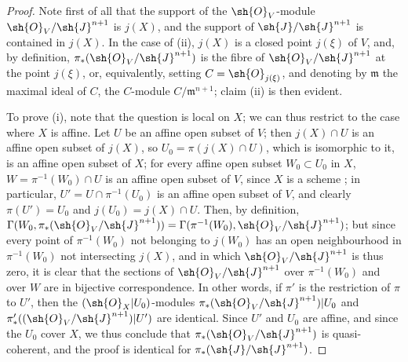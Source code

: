 \begin{proof}
Note first of all that the support of the $\sh{O}_V$-module $\sh{O}_V/\sh{J}^{n+1}$ is $j(X)$, and the support of $\sh{J}/\sh{J}^{n+1}$ is contained in $j(X)$.
In the case of (ii), $j(X)$ is a closed point $j(\xi)$ of $V$,
and, by definition, $\pi_*(\sh{O}_V/\sh{J}^{n+1})$ is the fibre of $\sh{O}_V/\sh{J}^{n+1}$ at the point $j(\xi)$, or, equivalently, setting $C=\sh{O}_{j(\xi)}$, and denoting by $\mathfrak{m}$ the maximal ideal of $C$, the $C$-module $C/\mathfrak{m}^{n+1}$;
claim (ii) is then evident.

To prove (i), note that the question is local on $X$;
we can thus restrict to the case where $X$ is affine.
Let $U$ be an affine open subset of $V$;
then $j(X)\cap U$ is an affine open subset of $j(X)$, so $U_0=\pi(j(X)\cap U)$, which is isomorphic to it, is an affine open subset of $X$;
for every affine open subset $W_0\subset U_0$ in $X$, $W=\pi^{-1}(W_0)\cap U$ is an affine open subset of $V$, since $X$ is a scheme ;
in particular, $U'=U\cap\pi^{-1}(U_0)$ is an affine open subset of $V$, and clearly $\pi(U')=U_0$ and $j(U_0)=j(X)\cap U$.
Then, by definition, $\Gamma(W_0,\pi_*(\sh{O}_V/\sh{J}^{n+1})) = \Gamma(\pi^{-1}(W_0),\sh{O}_V/\sh{J}^{n+1})$;
but since every point of $\pi^{-1}(W_0)$ not belonging to $j(W_0)$ has an open neighbourhood in $\pi^{-1}(W_0)$ not intersecting $j(X)$, and in which $\sh{O}_V/\sh{J}^{n+1}$ is thus zero, it is clear that the sections of $\sh{O}_V/\sh{J}^{n+1}$ over $\pi^{-1}(W_0)$ and over $W$ are in bijective correspondence.
In other words, if $\pi'$ is the restriction of $\pi$ to $U'$, then the $(\sh{O}_X|U_0)$-modules $\pi_*(\sh{O}_V/\sh{J}^{n+1})|U_0$ and $\pi'_*((\sh{O}_V/\sh{J}^{n+1})|U')$ are identical.
Since $U'$ and $U_0$ are affine, and since the $U_0$ cover $X$, we thus conclude  that $\pi_*(\sh{O}_V/\sh{J}^{n+1})$ is quasi-coherent, and the proof is identical for $\pi_*(\sh{J}/\sh{J}^{n+1})$.


\end{proof}

